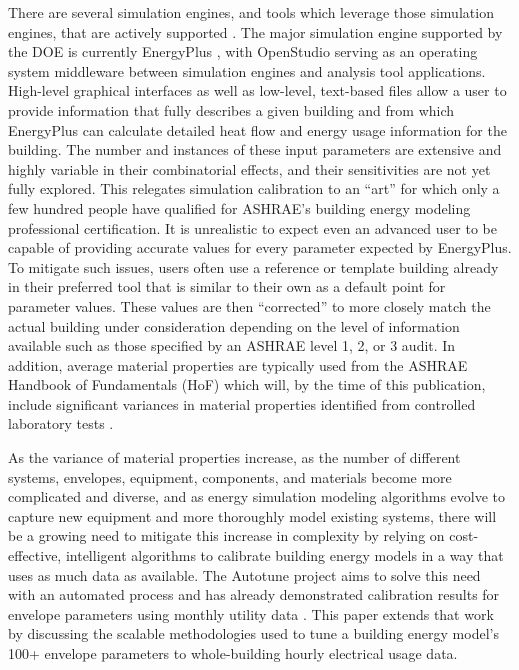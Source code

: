 \documentclass[preprint, review, 12pt]{elsarticle}
\begin{document}
There are several simulation engines, and tools which leverage those simulation engines, that are actively supported \cite{cit:doetools2012}. The major simulation engine supported by the DOE is currently EnergyPlus \cite{cit:energyplus}, with OpenStudio \cite{cit:nrel2012} serving as an operating system middleware between simulation engines and analysis tool applications. High-level graphical interfaces as well as low-level, text-based files allow a user to provide information that fully describes a given building and from which EnergyPlus can calculate detailed heat flow and energy usage information for the building. The number and instances of these input parameters are extensive and highly variable in their combinatorial effects, and their sensitivities are not yet fully explored. This relegates simulation calibration to an ``art'' for which only a few hundred people have qualified for ASHRAE's building energy modeling professional certification. It is unrealistic to expect even an advanced user to be capable of providing accurate values for every parameter expected by EnergyPlus. To mitigate such issues, users often use a reference or template building already in their preferred tool that is similar to their own as a default point for parameter values. These values are then ``corrected'' to more closely match the actual building under consideration depending on the level of information available such as those specified by an ASHRAE level 1, 2, or 3 audit. In addition, average material properties are typically used from the ASHRAE Handbook of Fundamentals (HoF) which will, by the time of this publication, include significant variances in material properties identified from controlled laboratory tests \cite{cit:ashrae2013}.

As the variance of material properties increase, as the number of different systems, envelopes, equipment, components, and materials become more complicated and diverse, and as energy simulation modeling algorithms evolve to capture new equipment and more thoroughly model existing systems, there will be a growing need to mitigate this increase in complexity by relying on cost-effective, intelligent algorithms to calibrate building energy models in a way that uses as much data as available. The Autotune project \cite{cit:new2012} aims to solve this need with an automated process and has already demonstrated calibration results for envelope parameters using monthly utility data \cite{cit:garrett2013}. This paper extends that work by discussing the scalable methodologies used to tune a building energy model's 100+ envelope parameters to whole-building hourly electrical usage data.
\end{document}
